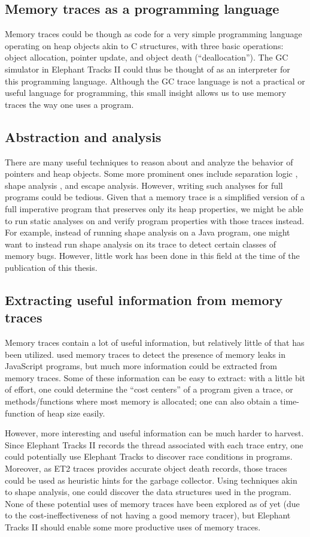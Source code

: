 \subsection{Memory traces as a programming language}
Memory traces could be though as code for a very simple programming language operating on heap objects akin to C structures, with three basic operations:
object allocation, pointer update, and object death (``deallocation''). The GC simulator in Elephant Tracks II could thus be thought of as an
interpreter for this programming language. Although the GC trace language is not a practical or useful language for programming, this small insight
allows us to use memory traces the way one uses a program.

\subsection{Abstraction and analysis}
There are many useful techniques to reason about and analyze the behavior of pointers and heap objects. Some more prominent ones include separation
logic \citep{SeparationLogic}, shape analysis \citep{ShapeAnalysis}, and escape analysis. However, writing such analyses for full programs could be
tedious. Given that a memory trace is a simplified version of a full imperative program that preserves only its heap properties, we might be able to
run static analyses on and verify program properties with those traces instead. For example, instead of running shape analysis on a Java program, one
might want to instead run shape analysis on its trace to detect certain classes of memory bugs. However, little work has been done in this field at the
time of the publication of this thesis.

\subsection{Extracting useful information from memory traces}
Memory traces contain a lot of useful information, but relatively little of that has been utilized. \cite{MemInsight} used memory traces to detect the
presence of memory leaks in JavaScript programs, but much more information could be extracted from memory traces. Some of these information can be easy
to extract: with a little bit of effort, one could determine the ``cost centers'' of a program given a trace, or methods/functions where most memory is
allocated; one can also obtain a time-function of heap size easily.

However, more interesting and useful information can be much harder to harvest. Since Elephant Tracks II records the thread associated with each trace
entry, one could potentially use Elephant Tracks to discover race conditions in programs. Moreover, as ET2 traces provides accurate object death
records, those traces could be used as heuristic hints for the garbage collector. Using techniques akin to shape analysis, one could discover the
data structures used in the program. None of these potential uses of memory traces have been explored as of yet (due to the cost-ineffectiveness of not
having a good memory tracer), but Elephant Tracks II should enable some more productive uses of memory traces.

